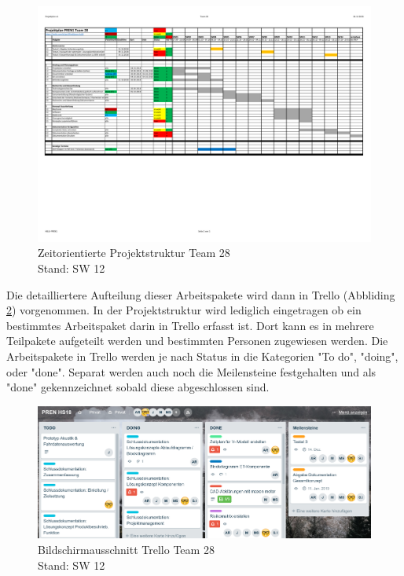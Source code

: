 \documentclass[../../main.tex]{subfiles}
\begin{document}
\begin{figure}[H] \centering
    \includegraphics[page=1,width=1\textwidth, trim=.6cm 7cm .6cm 1.5cm, clip]{Projektplanung.pdf}
    \caption{Zeitorientierte Projektstruktur Team 28\\Stand: SW 12}
    \label{fig:projektplanung}
\end{figure}

Die detailliertere Aufteilung dieser Arbeitspakete wird dann in Trello (Abbliding \ref{fig:screenTrello}) vorgenommen. In der Projektstruktur wird lediglich eingetragen ob ein bestimmtes Arbeitspaket darin in Trello erfasst ist. Dort kann es in mehrere Teilpakete aufgeteilt werden und bestimmten Personen zugewiesen werden. Die Arbeitspakete in Trello werden je nach Status in die Kategorien "To do", "doing", oder "done". Separat werden auch noch die Meilensteine festgehalten und als "done" gekennzeichnet sobald diese abgeschlossen sind.\\

\begin{figure}[H] \centering
    \includegraphics[page=1,width=.8\textwidth]{screenTrello.png}
    \caption{Bildschirmausschnitt Trello Team 28\\Stand: SW 12}
    \label{fig:screenTrello}
\end{figure}
\pagebreak
\end{document}
